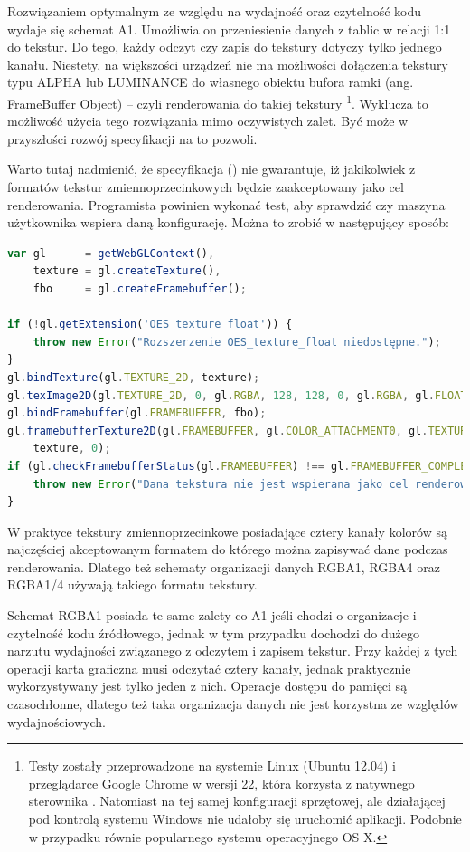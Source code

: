 Rozwiązaniem optymalnym ze względu na wydajność oraz czytelność kodu wydaje się
schemat A1. Umożliwia on przeniesienie danych z tablic w relacji 1:1 do tekstur.
Do tego, każdy odczyt czy zapis do tekstury dotyczy tylko jednego kanału.
Niestety, na większości urządzeń nie ma możliwości dołączenia tekstury typu
ALPHA lub LUMINANCE do własnego obiektu bufora ramki (ang. FrameBuffer Object)
-- czyli renderowania do takiej tekstury \footnote{Testy zostały przeprowadzone
na systemie Linux (Ubuntu 12.04) i przeglądarce Google Chrome w wersji 22, która
korzysta z natywnego sterownika . Natomiast na tej samej konfiguracji
sprzętowej, ale działającej pod kontrolą systemu Windows nie udałoby się
uruchomić aplikacji. Podobnie w przypadku równie popularnego systemu
operacyjnego OS X.}. Wyklucza to możliwość użycia tego rozwiązania mimo
oczywistych zalet. Być może w przyszłości rozwój specyfikacji  na to
pozwoli.

Warto tutaj nadmienić, że specyfikacja  (\cite{WebGLSpec}) nie
gwarantuje, iż jakikolwiek z formatów tekstur zmiennoprzecinkowych będzie
zaakceptowany jako cel renderowania. Programista powinien wykonać test, aby
sprawdzić czy maszyna użytkownika wspiera daną konfigurację. Można to zrobić w
następujący sposób:

\begin{lstlisting}[language=JavaScript, caption=Weryfikacja poprawności formatu
i typu tekstury używanej jako cel renderowania]
var gl 		= getWebGLContext(),
	texture = gl.createTexture(),
	fbo 	= gl.createFramebuffer();

if (!gl.getExtension('OES_texture_float')) {
	throw new Error("Rozszerzenie OES_texture_float niedostępne.");
}
gl.bindTexture(gl.TEXTURE_2D, texture);
gl.texImage2D(gl.TEXTURE_2D, 0, gl.RGBA, 128, 128, 0, gl.RGBA, gl.FLOAT, null);
gl.bindFramebuffer(gl.FRAMEBUFFER, fbo);
gl.framebufferTexture2D(gl.FRAMEBUFFER, gl.COLOR_ATTACHMENT0, gl.TEXTURE_2D, 
	texture, 0);
if (gl.checkFramebufferStatus(gl.FRAMEBUFFER) !== gl.FRAMEBUFFER_COMPLETE) {
	throw new Error("Dana tekstura nie jest wspierana jako cel renderowania.");
}
\end{lstlisting}

W praktyce tekstury zmiennoprzecinkowe posiadające cztery kanały kolorów są
najczęściej akceptowanym formatem do którego można zapisywać dane podczas
renderowania. Dlatego też schematy organizacji danych RGBA1, RGBA4 oraz RGBA1/4
używają takiego formatu tekstury.

Schemat RGBA1 posiada te same zalety co A1 jeśli chodzi o organizacje i
czytelność kodu źródłowego, jednak w tym przypadku dochodzi do dużego narzutu
wydajności związanego z odczytem i zapisem tekstur. Przy każdej z tych operacji
karta graficzna musi odczytać cztery kanały, jednak praktycznie wykorzystywany
jest tylko jeden z nich. Operacje dostępu do pamięci są czasochłonne, dlatego
też taka organizacja danych nie jest korzystna ze względów wydajnościowych.

